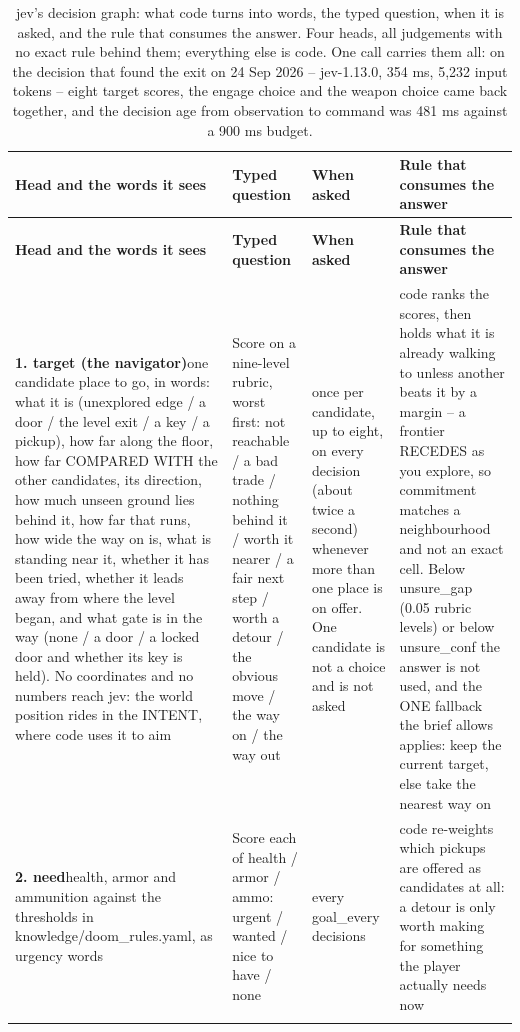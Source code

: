 \begingroup\footnotesize
\begin{longtable}{L{0.27\textwidth} L{0.21\textwidth} L{0.11\textwidth} L{0.29\textwidth}}
\caption{jev's decision graph: what code turns into words, the typed question, when it is asked, and the rule that consumes the answer. Four heads, all judgements with no exact rule behind them; everything else is code. One call carries them all: on the decision that found the exit on 24 Sep 2026 -- jev-1.13.0, 354 ms, 5,232 input tokens -- eight target scores, the engage choice and the weapon choice came back together, and the decision age from observation to command was 481 ms against a 900 ms budget.}\\
\toprule
\textbf{Head and the words it sees} & \textbf{Typed question} & \textbf{When asked} & \textbf{Rule that consumes the answer} \\
\midrule
\endfirsthead
\toprule
\textbf{Head and the words it sees} & \textbf{Typed question} & \textbf{When asked} & \textbf{Rule that consumes the answer} \\
\midrule
\endhead
\bottomrule
\endfoot
\textbf{1. target (the navigator)}\newline one candidate place to go, in words: what it is (unexplored edge / a door / the level exit / a key / a pickup), how far along the floor, how far COMPARED WITH the other candidates, its direction, how much unseen ground lies behind it, how far that runs, how wide the way on is, what is standing near it, whether it has been tried, whether it leads away from where the level began, and what gate is in the way (none / a door / a locked door and whether its key is held). No coordinates and no numbers reach jev: the world position rides in the INTENT, where code uses it to aim & Score on a nine-level rubric, worst first: not reachable / a bad trade / nothing behind it / worth it nearer / a fair next step / worth a detour / the obvious move / the way on / the way out & once per candidate, up to eight, on every decision (about twice a second) whenever more than one place is on offer. One candidate is not a choice and is not asked & code ranks the scores, then holds what it is already walking to unless another beats it by a margin -- a frontier RECEDES as you explore, so commitment matches a neighbourhood and not an exact cell. Below unsure\_gap (0.05 rubric levels) or below unsure\_conf the answer is not used, and the ONE fallback the brief allows applies: keep the current target, else take the nearest way on \\ \rowrule
\textbf{2. need}\newline health, armor and ammunition against the thresholds in knowledge/doom\_rules.yaml, as urgency words & Score each of health / armor / ammo: urgent / wanted / nice to have / none & every goal\_every decisions & code re-weights which pickups are offered as candidates at all: a detour is only worth making for something the player actually needs now \\ \rowrule

\end{longtable}
